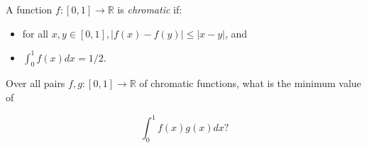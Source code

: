 \begin{problem}
    A function \( f : \left[0, 1\right] \rightarrow \mathbb{R} \) is \textit{chromatic} if:
    \begin{itemize}
        \item for all \( x, y \in \left[0, 1\right], |f\left(x\right) - f\left(y\right)| \leq |x - y| \), and
        \item \( \int_{0}^{1} f\left(x\right) dx = 1/2 \).
    \end{itemize}


    Over all pairs \( f, g : \left[0, 1\right] \rightarrow \mathbb{R} \) of chromatic functions, what is the minimum value of

    \[
        \int_{0}^{1} f\left(x\right)g\left(x\right) dx?
    \]
\end{problem}
